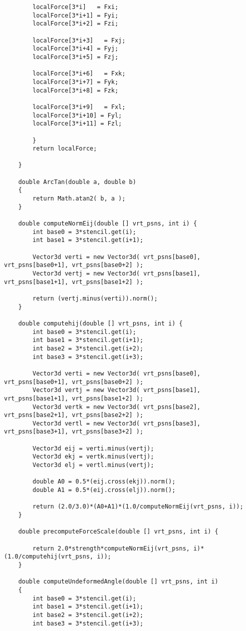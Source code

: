 \begin{lstlisting}
		localForce[3*i]   = Fxi;
		localForce[3*i+1] = Fyi;
		localForce[3*i+2] = Fzi;
		
		localForce[3*i+3]   = Fxj;
		localForce[3*i+4] = Fyj;
		localForce[3*i+5] = Fzj;
		
		localForce[3*i+6]   = Fxk;
		localForce[3*i+7] = Fyk;
		localForce[3*i+8] = Fzk;
		
		localForce[3*i+9]   = Fxl;
		localForce[3*i+10] = Fyl;
		localForce[3*i+11] = Fzl;
			
		}
		return localForce;
	
	}
	
	double ArcTan(double a, double b)
	{
		return Math.atan2( b, a );
	}
	
	double computeNormEij(double [] vrt_psns, int i) {
		int base0 = 3*stencil.get(i);
		int base1 = 3*stencil.get(i+1);
		
		Vector3d verti = new Vector3d( vrt_psns[base0], vrt_psns[base0+1], vrt_psns[base0+2] );
		Vector3d vertj = new Vector3d( vrt_psns[base1], vrt_psns[base1+1], vrt_psns[base1+2] );
		
		return (vertj.minus(verti)).norm();
	}
	
	double computehij(double [] vrt_psns, int i) {
		int base0 = 3*stencil.get(i);
		int base1 = 3*stencil.get(i+1);
		int base2 = 3*stencil.get(i+2);
		int base3 = 3*stencil.get(i+3);
		
		Vector3d verti = new Vector3d( vrt_psns[base0], vrt_psns[base0+1], vrt_psns[base0+2] );
		Vector3d vertj = new Vector3d( vrt_psns[base1], vrt_psns[base1+1], vrt_psns[base1+2] );
		Vector3d vertk = new Vector3d( vrt_psns[base2], vrt_psns[base2+1], vrt_psns[base2+2] );
		Vector3d vertl = new Vector3d( vrt_psns[base3], vrt_psns[base3+1], vrt_psns[base3+2] );
		
		Vector3d eij = verti.minus(vertj);
		Vector3d ekj = vertk.minus(vertj);
		Vector3d elj = vertl.minus(vertj);
		
		double A0 = 0.5*(eij.cross(ekj)).norm();
		double A1 = 0.5*(eij.cross(elj)).norm();
		
		return (2.0/3.0)*(A0+A1)*(1.0/computeNormEij(vrt_psns, i));
	}
	
	double precomputeForceScale(double [] vrt_psns, int i) {
		
		return 2.0*strength*computeNormEij(vrt_psns, i)*(1.0/computehij(vrt_psns, i));
	}
	
	double computeUndeformedAngle(double [] vrt_psns, int i)
	{
		int base0 = 3*stencil.get(i);
		int base1 = 3*stencil.get(i+1);
		int base2 = 3*stencil.get(i+2);
		int base3 = 3*stencil.get(i+3);
		

\end{lstlisting}

